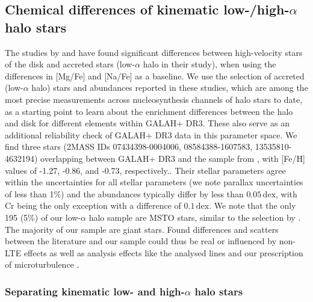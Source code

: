 \documentclass[fleqn,usenatbib]{mnras}
\newcommand{\added}[1]{#1}
\newcommand{\dex}{\,\mathrm{dex}}	%
\begin{document}
\subsection{Chemical differences of kinematic low-/high-\texorpdfstring{$\alpha$}{alpha} halo stars} \label{sec:enrichment_differences}

The studies by \citet{Nissen2010,Nissen2011,Nissen2012} and \citet{Nissen2014} have found significant differences between high-velocity stars of the disk and accreted stars (low-$\alpha$ halo in their study), when using the differences in [Mg/Fe] and [Na/Fe] as a baseline. We use the selection of accreted (low-$\alpha$ halo) stars and abundances reported in these studies, which are among the most precise measurements across nucleosynthesis channels of halo stars to date, as a starting point to learn about the enrichment differences between the halo and disk for different elements within GALAH+ DR3. These also serve as an additional reliability check of GALAH+ DR3 data in this parameter space. We find three stars (2MASS IDs 07434398-0004006, 08584388-1607583, 13535810-4632194) overlapping between GALAH+ DR3 and the sample from \citet{Nissen2010}\added{, with [Fe/H] values of -1.27, -0.86, and -0.73, respectively.}. Their stellar parameters agree within the uncertainties for all stellar parameters (we note parallax uncertainties of less than 1\%) and the abundances typically differ by less than $0.05\dex$, with Cr being the only exception with a difference of $0.1\dex$.
\added{We note that the only 195 (5\%) of our low-$\alpha$ halo sample are MSTO stars, similar to the selection by \citet{Nissen2010}. The majority of our sample are giant stars. Found differences and scatters between the literature and our sample could thus be real or influenced by non-LTE effects as well as analysis effects like the analysed lines and our prescription of microturbulence \citep[see discussion in Sec.~6.4 of][]{Buder2021}.}

\subsubsection{Separating kinematic low- and high-\texorpdfstring{$\alpha$}{alpha} halo stars}
\end{document}
